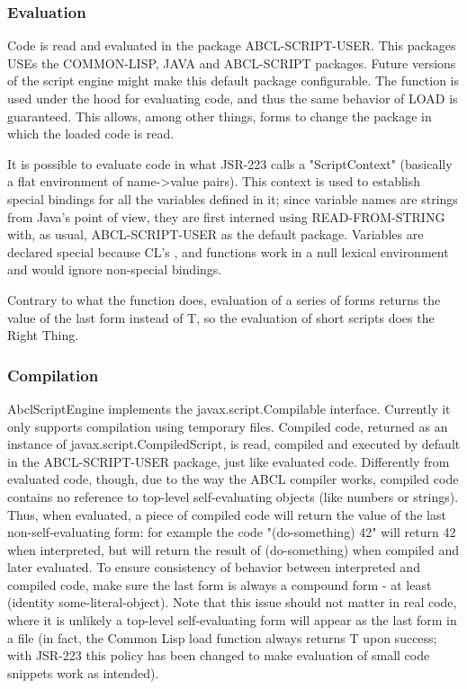 \documentclass[10pt]{book}
\begin{document}
\subsubsection{Evaluation}

Code is read and evaluated in the package ABCL-SCRIPT-USER. This
packages USEs the COMMON-LISP, JAVA and ABCL-SCRIPT packages. Future
versions of the script engine might make this default package
configurable. The  function is used under the hood for
evaluating code, and thus the same behavior of LOAD is
guaranteed. This allows, among other things,  forms
to change the package in which the loaded code is read.

It is possible to evaluate code in what JSR-223 calls a
"ScriptContext" (basically a flat environment of name->value
pairs). This context is used to establish special bindings for all the
variables defined in it; since variable names are strings from Java's
point of view, they are first interned using READ-FROM-STRING with, as
usual, ABCL-SCRIPT-USER as the default package. Variables are declared
special because CL's ,  and 
functions work in a null lexical environment and would ignore
non-special bindings.

Contrary to what the function  does, evaluation of a series
of forms returns the value of the last form instead of T, so the
evaluation of short scripts does the Right Thing.

\subsubsection{Compilation}

AbclScriptEngine implements the javax.script.Compilable
interface. Currently it only supports compilation using temporary
files. Compiled code, returned as an instance of
javax.script.CompiledScript, is read, compiled and executed by default
in the ABCL-SCRIPT-USER package, just like evaluated code. Differently
from evaluated code, though, due to the way the ABCL compiler works,
compiled code contains no reference to top-level self-evaluating
objects (like numbers or strings). Thus, when evaluated, a piece of
compiled code will return the value of the last non-self-evaluating
form: for example the code "(do-something) 42" will return 42 when
interpreted, but will return the result of (do-something) when
compiled and later evaluated. To ensure consistency of behavior
between interpreted and compiled code, make sure the last form is
always a compound form - at least (identity some-literal-object). Note
that this issue should not matter in real code, where it is unlikely a
top-level self-evaluating form will appear as the last form in a file
(in fact, the Common Lisp load function always returns T upon success;
with JSR-223 this policy has been changed to make evaluation of small
code snippets work as intended).
\end{document}
